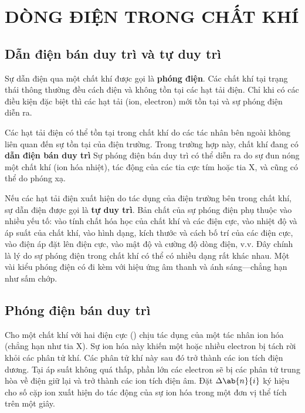 

\chapter[DÒNG ĐIỆN TRONG CHẤT KHÍ]{DÒNG ĐIỆN TRONG CHẤT KHÍ}\label{chap:12}


\section{Dẫn điện bán duy trì và tự duy trì}\label{sec:12_1}

Sự dẫn điện qua một chất khí được gọi là \textbf{phóng điện}.
Các chất khí tại trạng thái thông thường đều cách điện và không tồn tại các hạt tải điện.
Chỉ khi có các điều kiện đặc biệt thì các hạt tải (ion, electron) mới tồn tại và sự phóng điện diễn ra.

Các hạt tải điện có thể tồn tại trong chất khí do các tác nhân bên ngoài không liên quan đến sự tồn tại của điện trường.
Trong trường hợp này, chất khí đang có \textbf{dẫn điện bán duy trì}
Sự phóng điện bán duy trì có thể diễn ra do sự đun nóng một chất khí (ion hóa nhiệt), tác động của các tia cực tím hoặc tia X, và cũng có thể do phóng xạ.

Nếu các hạt tải điện xuất hiện do tác dụng của điện trường bên trong chất khí, sự dẫn điện được gọi là \textbf{tự duy trì}.
Bản chất của sự phóng điện phụ thuộc vào nhiều yếu tố: vào tính chất hóa học của chất khí và các điện cực, vào nhiệt độ và áp suất của chất khí, vào hình dạng, kích thước và cách bố trí 
của các điện cực, vào điện áp đặt lên điện cực, vào mật độ và cường độ dòng điện, v.v.
Đây chính là lý do sự phóng điện trong chất khí có thể có nhiều dạng rất khác nhau.
Một vài kiểu phóng điện có đi kèm với hiệu ứng âm thanh và ánh sáng---chẳng hạn như sấm chớp.

\section{Phóng điện bán duy trì}\label{sec:12_2}

Cho một chất khí với hai điện cực () chịu tác dụng của một tác nhân ion hóa (chẳng hạn như tia X).
Sự ion hóa này khiến một hoặc nhiều electron bị tách rời khỏi các phân tử khí.
Các phân tử khí này sau đó trở thành các ion tích điện dương.
Tại áp suất không quá thấp, phần lớn các electron sẽ bị các phân tử trung hòa về điện giữ lại và trở thành các ion tích điện âm.
Đặt $\Delta{\ab{n}{i}}$ ký hiệu cho số cặp ion xuất hiện do tác động của sự ion hóa trong một đơn vị thể tích trên một giây.

